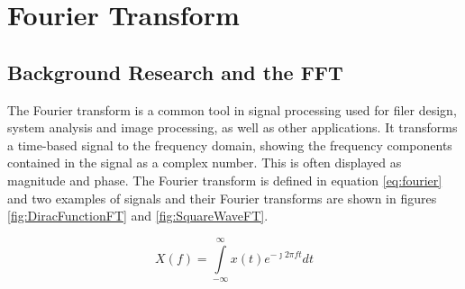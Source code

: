 \section{Fourier Transform}
\subsection{Background Research and the FFT}
The Fourier transform is a common tool in signal processing used for filer design, system analysis and image processing, as well as other applications. It transforms a time-based signal to the frequency domain, showing the frequency components contained in the signal as a complex number. This is often displayed as magnitude and phase. The Fourier transform is defined in equation \eqref{eq:fourier} and two examples of signals and their Fourier transforms are shown in figures \ref{fig:DiracFunctionFT} and \ref{fig:SquareWaveFT}. 
 
\begin{equation}\label{eq:fourier}
X(f) = \int\limits_{-\infty}^{\infty}x(t)e^{-\jmath 2 \pi ft}dt
\end{equation}

